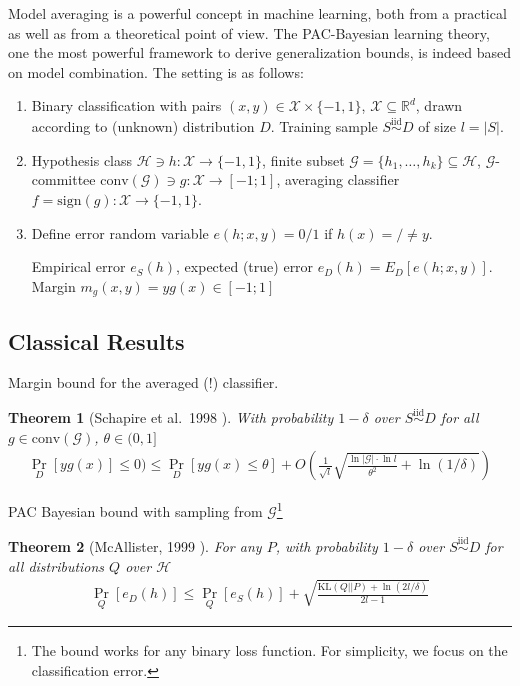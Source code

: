 \documentclass[10pt,a4paper]{article}
\newtheorem{theorem}{Theorem}
\renewcommand{\Re}{{\mathbb R}}
\begin{document}
Model averaging is a powerful concept in machine learning, both from a practical as well as from a theoretical point of view. The PAC-Bayesian learning theory, one the most powerful framework to derive generalization bounds, is indeed based on model combination. The setting is as follows: 
\begin{enumerate}
\item Binary classification with pairs $ (x,y) \in \mathcal X \times \{-1,1\}$, $\mathcal X \subseteq \Re^d$, drawn according to (unknown) distribution $D$. Training sample $S \stackrel {\text{iid} }\sim D$ of size $l = |S|$.
%
\item Hypothesis class $\mathcal H  \ni h: \mathcal X \to \{-1,1\}$, finite subset $\mathcal G = \{ h_1, \dots, h_k\} \subseteq \mathcal H$, $\mathcal G$-committee $\text{conv}(\mathcal G) \ni g: \mathcal X \to [-1;1]$, averaging classifier $f = \text{sign}(g): \mathcal X \to \{-1,1\}$.
%
\item Define error random variable $e(h; x,y) = 0/1$ if $h(x)=/\neq y$.




Empirical error $e_S(h)$, expected (true) error $e_D(h) = E_D\left[ e(h;x,y)\right] $. Margin $m_g(x,y) = y g(x) \in [-1;1]$
\end{enumerate}

\subsection{Classical Results}
Margin bound for the averaged (!) classifier.
\begin{theorem}[Schapire et al.~1998 \cite{schapire1998boosting}]
With probability $1-\delta$ over $S \stackrel {\text{iid} }\sim D$ for all $g \in \text{conv}(\mathcal G)$, $\theta \in (0,1]$
\begin{align*}
\Pr_D[yg(x)] \le 0) \le  \Pr_D[yg(x) \le \theta] +  O\left(  \frac{1}{\sqrt l}
\sqrt{\frac{\ln |\mathcal G| \cdot \ln l}{\theta^2} + \ln(1/\delta)}
\right)
\end{align*} 
\end{theorem}

\noindent PAC Bayesian bound with sampling from $\mathcal G$\footnote{The bound works for any binary loss function. For simplicity, we focus on the classification error.}
\begin{theorem}[McAllister, 1999 \cite{mcallester1999pac}]
For any $P$, with probability $1-\delta$ over $S \stackrel {\text{iid} }\sim D$ for all distributions $Q$ over $\mathcal H$
\begin{align*}
\Pr_{Q}[e_D(h)]  \le \Pr_{Q}[e_S(h)] + \sqrt{
\frac{\text{KL}(Q||P)  + \ln (2l/\delta)}{2l-1} 
}
\end{align*}
\end{theorem}
\end{document}
